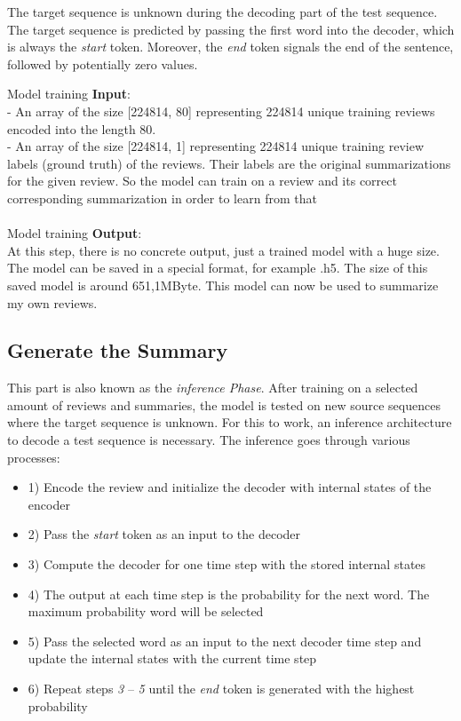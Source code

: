 The target sequence is unknown during the decoding part of the test sequence. The target sequence is predicted by passing the first word into the decoder, which is always the \textit{start} token. Moreover, the \textit{end} token signals the end of the sentence, followed by potentially zero values.


\begin{tcolorbox}
	Model training \textbf{Input}:\\
	
	- An array of the size [224814, 80] representing 224814 unique training reviews encoded into the length 80. \\
	- An array of the size [224814, 1] representing 224814 unique training review labels (ground truth) of the reviews. Their labels are the original summarizations for the given review. So the model can train on a review and its correct corresponding summarization in order to learn from that
	\\\\
	Model training \textbf{Output}:\\
	
	At this step, there is no concrete output, just a trained model with a huge size. The model can be saved in a special format, for example .h5. The size of this saved model is around 651,1MByte. This model can now be used to summarize my own reviews.
\end{tcolorbox}

\subsection{Generate the Summary}\label{ss:generate}

This part is also known as the \textit{inference Phase}. After training on a selected amount of reviews and summaries, the model is tested on new source sequences where the target sequence is unknown. For this to work, an inference architecture to decode a test sequence is necessary. The inference goes through various processes:

\begin{itemize}
	\item 1) Encode the review and initialize the decoder with internal states of the encoder
	\item 2) Pass the \textit{start} token as an input to the decoder
	\item 3) Compute the decoder for one time step with the stored internal states
	\item 4) The output at each time step is the probability for the next word. The maximum probability word will be selected
	\item 5) Pass the selected word as an input to the next decoder time step and update the internal states with the current time step
	\item 6) Repeat steps \textit{3} – \textit{5} until the \textit{end} token is generated with the highest probability
\end{itemize}

